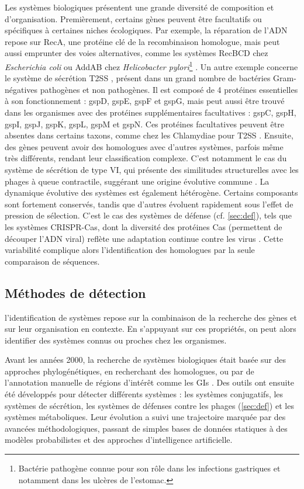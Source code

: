 Les systèmes biologiques présentent une grande diversité de composition et d’organisation. Premièrement, certains gènes peuvent être facultatifs ou spécifiques à certaines niches écologiques. Par exemple, la réparation de l’ADN repose sur RecA, une protéine clé de la recombinaison homologue, mais peut aussi emprunter des voies alternatives, comme les systèmes RecBCD chez \textit{Escherichia coli} ou AddAB chez \textit{Helicobacter pylori}\footnote{Bactérie pathogène connue pour son rôle dans les infections gastriques et notamment dans les ulcères de l'estomac.} \cite{dillingham_recbcd_2008}. Un autre exemple concerne le système de sécrétion T2SS \cite{korotkov_type_2012}, présent dans un grand nombre de bactéries Gram-négatives pathogènes et non pathogènes. Il est composé de 4 protéines essentielles à son fonctionnement : gspD, gspE, gspF et gspG, mais peut aussi être trouvé dans les organismes avec des protéines supplémentaires facultatives : gspC, gspH, gspI, gspJ, gspK, gspL, gspM et gspN. Ces protéines facultatives peuvent être absentes dans certains taxons, comme chez les Chlamydiae pour T2SS \cite{abby_identification_2016}. Ensuite, des gènes peuvent avoir des homologues avec d’autres systèmes, parfois même très différents, rendant leur classification complexe. C’est notamment le cas du système de sécrétion de type VI, qui présente des similitudes structurelles avec les phages à queue contractile, suggérant une origine évolutive commune \cite{coulthurst_type_2013}. La dynamique évolutive des systèmes est également hétérogène. Certains composants sont fortement conservés, tandis que d'autres évoluent rapidement sous l'effet de pression de sélection. C'est le cas des systèmes de défense (cf. \autoref{sec:def}), tels que les systèmes CRISPR-Cas, dont la diversité des protéines Cas (permettent de découper l'ADN viral) reflète une adaptation continue contre les virus \cite{makarova_comparative_2013}. Cette variabilité complique alors l’identification des homologues par la seule comparaison de séquences.

\subsection{Méthodes de détection}

l'identification de systèmes repose sur la combinaison de la recherche des gènes et sur leur organisation en contexte. En s'appuyant sur ces propriétés, on peut alors identifier des systèmes connus ou proches chez les organismes.

Avant les années 2000, la recherche de systèmes biologiques était basée sur des approches phylogénétiques, en recherchant des homologues, ou par de l'annotation manuelle de régions d'intérêt comme les GIs \cite{buchrieser_high-pathogenicity_1998}. Des outils ont ensuite été développés pour détecter différents systèmes : les systèmes conjugatifs, les systèmes de sécrétion, les systèmes de défenses contre les phages (\autoref{sec:def}) et les systèmes métaboliques. Leur évolution a suivi une trajectoire marquée par des avancées méthodologiques, passant de simples bases de données statiques à des modèles probabilistes et des approches d’intelligence artificielle.

